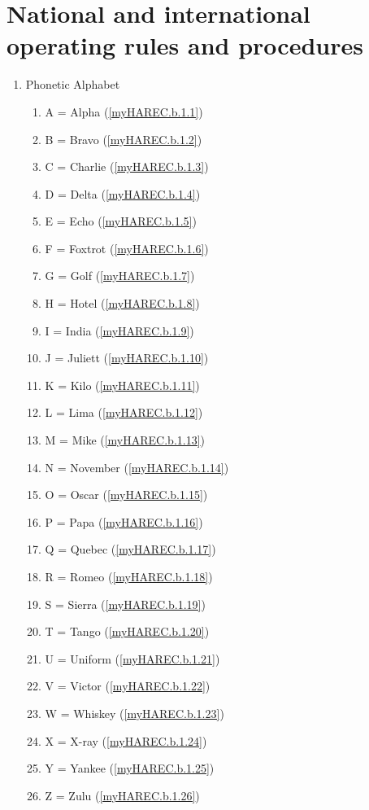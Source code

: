 \section[Rules and procedures]{National and international operating rules and procedures}

\begin{enumerate}

\item Phonetic Alphabet
\begin{enumerate}
\item A = Alpha (\ref{myHAREC.b.1.1})\label{HAREC.b.1.1}
\item B = Bravo (\ref{myHAREC.b.1.2})\label{HAREC.b.1.2}
\item C = Charlie (\ref{myHAREC.b.1.3})\label{HAREC.b.1.3}
\item D = Delta (\ref{myHAREC.b.1.4})\label{HAREC.b.1.4}
\item E = Echo (\ref{myHAREC.b.1.5})\label{HAREC.b.1.5}
\item F = Foxtrot (\ref{myHAREC.b.1.6})\label{HAREC.b.1.6}
\item G = Golf (\ref{myHAREC.b.1.7})\label{HAREC.b.1.7}
\item H = Hotel (\ref{myHAREC.b.1.8})\label{HAREC.b.1.8}
\item I = India (\ref{myHAREC.b.1.9})\label{HAREC.b.1.9}
\item J = Juliett (\ref{myHAREC.b.1.10})\label{HAREC.b.1.10}
\item K = Kilo (\ref{myHAREC.b.1.11})\label{HAREC.b.1.11}
\item L = Lima (\ref{myHAREC.b.1.12})\label{HAREC.b.1.12}
\item M = Mike (\ref{myHAREC.b.1.13})\label{HAREC.b.1.13}
\item N = November (\ref{myHAREC.b.1.14})\label{HAREC.b.1.14}
\item O = Oscar (\ref{myHAREC.b.1.15})\label{HAREC.b.1.15}
\item P = Papa (\ref{myHAREC.b.1.16})\label{HAREC.b.1.16}
\item Q = Quebec (\ref{myHAREC.b.1.17})\label{HAREC.b.1.17}
\item R = Romeo (\ref{myHAREC.b.1.18})\label{HAREC.b.1.18}
\item S = Sierra (\ref{myHAREC.b.1.19})\label{HAREC.b.1.19}
\item T = Tango (\ref{myHAREC.b.1.20})\label{HAREC.b.1.20}
\item U = Uniform (\ref{myHAREC.b.1.21})\label{HAREC.b.1.21}
\item V = Victor (\ref{myHAREC.b.1.22})\label{HAREC.b.1.22}
\item W = Whiskey (\ref{myHAREC.b.1.23})\label{HAREC.b.1.23}
\item X = X-ray (\ref{myHAREC.b.1.24})\label{HAREC.b.1.24}
\item Y = Yankee (\ref{myHAREC.b.1.25})\label{HAREC.b.1.25}
\item Z = Zulu (\ref{myHAREC.b.1.26})\label{HAREC.b.1.26}
\end{enumerate}


\end{enumerate}
